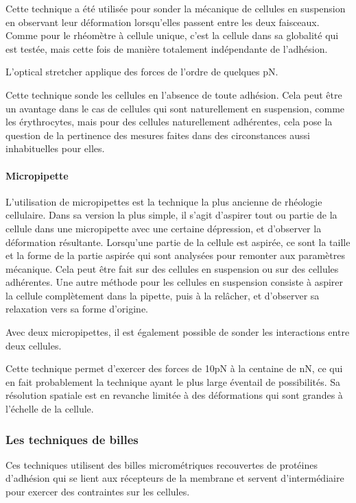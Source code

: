 Cette technique a été utilisée pour sonder la mécanique de cellules en suspension en observant leur déformation lorsqu'elles passent entre les deux faisceaux. 
Comme pour le rhéomètre à cellule unique, c'est la cellule dans sa globalité qui est testée, mais cette fois de manière totalement indépendante de l'adhésion. 

L'optical stretcher applique des forces de l'ordre de quelques pN. 

Cette technique sonde les cellules en l'absence de toute adhésion. Cela peut être un avantage dans le cas de cellules qui sont naturellement en suspension, comme les érythrocytes, mais pour des cellules naturellement adhérentes, cela pose la question de la pertinence des mesures faites dans des circonstances aussi inhabituelles pour elles. 

\paragraph{Micropipette}

L'utilisation de micropipettes est la technique la plus ancienne de rhéologie cellulaire. 
Dans sa version la plus simple, il s'agit d'aspirer tout ou partie de la cellule dans une micropipette avec une certaine dépression, et d'observer la déformation résultante. 
Lorsqu'une partie de la cellule est aspirée, ce sont la taille et la forme de la partie aspirée qui sont analysées pour remonter aux paramètres mécanique. 
Cela peut être fait sur des cellules en suspension ou sur des cellules adhérentes.
Une autre méthode pour les cellules en suspension consiste à aspirer la cellule complètement dans la pipette, puis à la relâcher, et d'observer sa relaxation vers sa forme d'origine. 

 
Avec deux micropipettes, il est également possible de sonder les interactions entre deux cellules. 

Cette technique permet d'exercer des forces de 10pN à la centaine de nN, ce qui en fait probablement la technique ayant le plus large éventail de possibilités. Sa résolution spatiale est en revanche limitée à des déformations qui sont grandes à l'échelle de la cellule. 



\subsubsection{Les techniques de billes}
Ces techniques utilisent des billes micrométriques recouvertes de protéines d'adhésion qui se lient aux récepteurs de la membrane et servent d'intermédiaire pour exercer des contraintes sur les cellules. 

